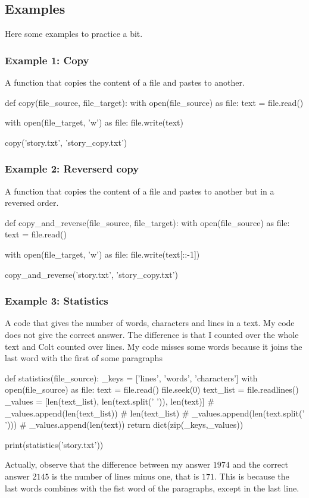 \subsection{Examples}

Here some examples to practice a bit. 

\subsubsection{Example 1: Copy}

A function that copies the content of a file and pastes to another. 
\begin{listing}{1}
def copy(file_source, file_target):
    with open(file_source) as file:
        text = file.read()

    with open(file_target, 'w') as file:
        file.write(text)

copy('story.txt', 'story_copy.txt')    
\end{listing}

\subsubsection{Example 2: Reverserd copy}

A function that copies the content of a file and pastes to another but in a reversed order. 
\begin{listing}{1}
def copy_and_reverse(file_source, file_target):
    with open(file_source) as file:
        text = file.read()

    with open(file_target, 'w') as file:
        file.write(text[::-1])

copy_and_reverse('story.txt', 'story_copy.txt')     
\end{listing}

\subsubsection{Example 3: Statistics}

A code that gives the number of words, characters and lines in a text. My code does not give the correct answer. The difference is that I counted over the whole text and Colt counted over lines. My code misses some words because it joins the last word with the first of some paragraphs
\begin{listing}{1}
def statistics(file_source):
    _keys = ['lines', 'words', 'characters']
    with open(file_source) as file:
        text = file.read()
        file.seek(0)
        text_list = file.readlines()
        _values = [len(text_list), len(text.split(' ')), len(text)]
        # _values.append(len(text_list)) # len(text_list)
        # _values.append(len(text.split(' ')))
        # _values.append(len(text))
    return dict(zip(_keys,_values))

print(statistics('story.txt'))    
\end{listing}
Actually, observe that the difference between my answer \(1974\) and the correct answer \(2145\) is the number of lines minus one, that is \(171\). This is because the last words combines with the fist word of the paragraphs, except in the last line. 

